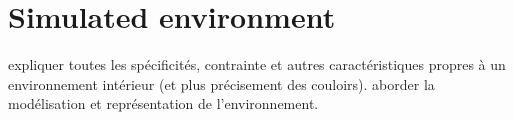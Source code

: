 \chapter{Simulated environment}

expliquer toutes les spécificités, contrainte et autres caractéristiques propres à un environnement intérieur (et plus précisement des couloirs). aborder la modélisation et représentation de l'environnement.
